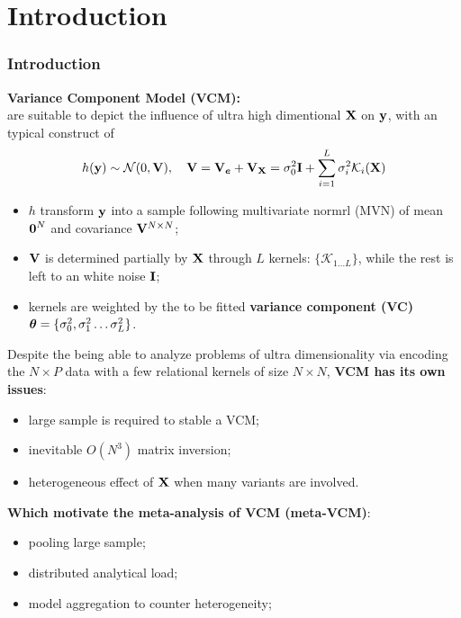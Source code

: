 \documentclass{beamer}
\begin{document}
\section{Introduction}
\begin{frame}
  \frametitle{Introduction} %
  \textbf{Variance Component Model (VCM):} \\
  are suitable to depict the influence of ultra high dimentional $\mathbf{X}$
  on $\mathbf{y}$, with an typical construct of
  \begin{align}\label{eq:vcm}
    h(\mathbf{y}) \sim \mathcal{N}(0, \mathbf{V}), \quad
    \mathbf{V} = \mathbf{V}_{\boldsymbol{e}} + \mathbf{V}_{\mathbf{X}} = \sigma^2_0 \textbf{I} + \sum_{i=1}^L
    \sigma^2_i \mathcal{K}_i(\mathbf{X})
  \end{align}
  \begin{itemize}
  \item $h$ transform $\mathbf{y}$ into a sample following multivariate
    normrl (MVN) of mean $\boldsymbol{0}^N$ and covariance $\mathbf{V}^{N \times N}$;
  \item $\mathbf{V}$ is determined partially by $\mathbf{X}$ through $L$ kernels:
    $\{\mathcal{K}_{1 \dots L}\}$, while the rest is left to an white
    noise $\textbf{I}$;
  \item kernels are weighted by the to be fitted \textbf{variance
      component (VC)}
    $\boldsymbol{\theta} = \{\sigma^2_0, \sigma^2_1 \dots \sigma^2_L\}$.
  \end{itemize}
\end{frame}
\begin{frame}
  Despite the being able to analyze problems of ultra dimensionality
  via encoding the $N \times P$ data with a few relational kernels of
  size $N \times N$, \textbf{VCM has its own issues}:
  \begin{itemize}
  \item large sample is required to stable a VCM;
  \item inevitable $O(N^3)$ matrix inversion;
  \item heterogeneous effect of $\mathbf{X}$ when many variants are involved.
  \end{itemize}
  \textbf{Which motivate the meta-analysis of VCM (meta-VCM)}:
  \begin{itemize}
  \item pooling large sample;
  \item distributed analytical load;
  \item model aggregation to counter heterogeneity;
  \end{itemize}
\end{frame}
\end{document}
